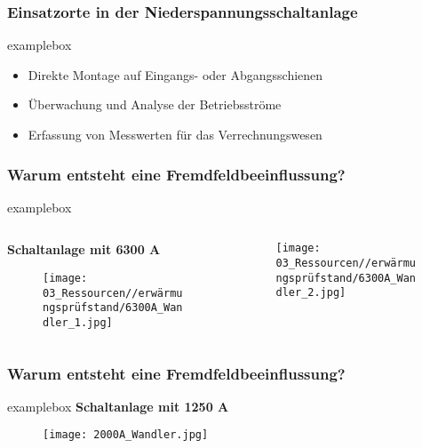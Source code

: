 \begin{frame}
    \frametitle{Einsatzorte in der Niederspannungsschaltanlage}
    \begin{beamercolorbox}[wd=\textwidth, sep=1.2ex, rounded=true, shadow=true]{examplebox}
        \begin{itemize}
            \item Direkte Montage auf Eingangs- oder Abgangsschienen
            \item Überwachung und Analyse der Betriebsströme
            \item Erfassung von Messwerten für das Verrechnungswesen
        \end{itemize}
    \end{beamercolorbox}
\end{frame}




\begin{frame}
    \frametitle{Warum entsteht eine Fremdfeldbeeinflussung?}
    \begin{beamercolorbox}[wd=\textwidth, sep=1ex, rounded=true, shadow=true]{examplebox}
        \begin{columns}[T]
            \begin{column}{0.55\textwidth}
                \textbf{Schaltanlage mit 6300 A}
                \begin{figure}
                    \centering
                    \texttt{[image: 03\_Ressourcen//erwärmungsprüfstand/6300A\_Wandler\_1.jpg]}
                \end{figure}

            \end{column}

            \begin{column}{0.3\textwidth}
                \begin{figure}
                    \centering
                    \texttt{[image: 03\_Ressourcen//erwärmungsprüfstand/6300A\_Wandler\_2.jpg]}
                \end{figure}
            \end{column}
        \end{columns}
    \end{beamercolorbox}
\end{frame}



\begin{frame}
    \frametitle{Warum entsteht eine Fremdfeldbeeinflussung?}
    \begin{beamercolorbox}[wd=0.89\textwidth, sep=1ex, rounded=true, shadow=true]{examplebox}
        \textbf{Schaltanlage mit 1250 A}
        \begin{figure}
            \centering
            \texttt{[image: 2000A\_Wandler.jpg]}
        \end{figure}
    \end{beamercolorbox}
\end{frame}


